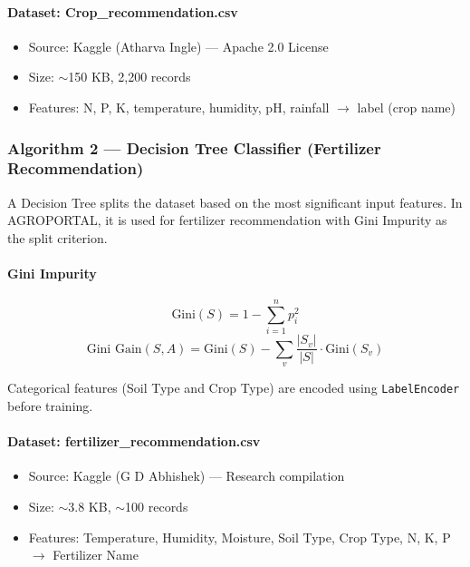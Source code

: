 \paragraph{Dataset: Crop\_recommendation.csv}
\begin{itemize}
    \item Source: Kaggle (Atharva Ingle) --- Apache 2.0 License \cite{ref7}
    \item Size: $\sim$150 KB, 2,200 records
    \item Features: N, P, K, temperature, humidity, pH, rainfall $\rightarrow$ label (crop name)
\end{itemize}

\subsubsection{Algorithm 2 --- Decision Tree Classifier (Fertilizer Recommendation)}

A Decision Tree splits the dataset based on the most significant input features. In AGROPORTAL, it is used for fertilizer recommendation with Gini Impurity as the split criterion.

\paragraph{Gini Impurity}
\begin{equation}
\text{Gini}(S) = 1 - \sum_{i=1}^{n} p_i^2
\label{eq:gini}
\end{equation}
\begin{equation}
\text{Gini Gain}(S, A) = \text{Gini}(S) - \sum_{v} \frac{|S_v|}{|S|} \cdot \text{Gini}(S_v)
\label{eq:gini_gain}
\end{equation}

Categorical features (Soil Type and Crop Type) are encoded using \texttt{LabelEncoder} before training.

\paragraph{Dataset: fertilizer\_recommendation.csv}
\begin{itemize}
    \item Source: Kaggle (G D Abhishek) --- Research compilation \cite{ref8}
    \item Size: $\sim$3.8 KB, $\sim$100 records
    \item Features: Temperature, Humidity, Moisture, Soil Type, Crop Type, N, K, P $\rightarrow$ Fertilizer Name
\end{itemize}

